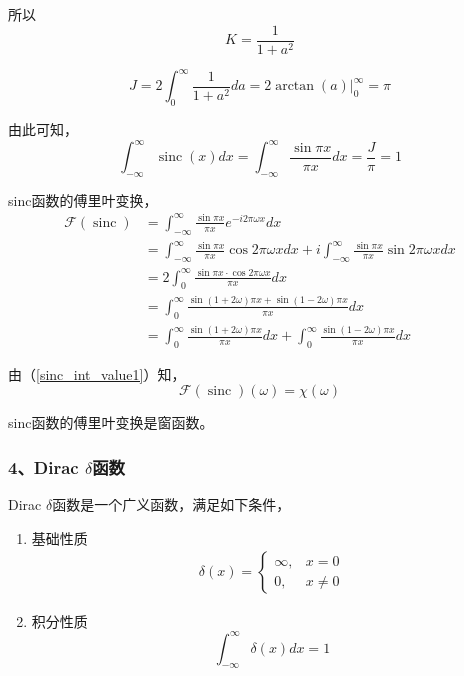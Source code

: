 		所以
		$$
			K = \frac{1}{1+ a^2}
		$$

		$$
			J = 2\int_{0}^{\infty} \frac{1}{1+a^2}da = 2\arctan(a)\Big|_0^\infty = \pi
		$$

		由此可知，
		\begin{equation}
			\int_{-\infty}^{\infty} \mathop{sinc}(x)dx = \int_{-\infty}^{\infty} \frac{\sin \pi x}{\pi x}dx = \frac{J}{\pi} = 1 \label{sinc_int_value1}
		\end{equation}

		sinc函数的傅里叶变换，
		\begin{align*}
			\mathcal{F}(\mathop{sinc}) 
				& = \int_{-\infty}^{\infty} \frac{\sin \pi x}{\pi x} e^{-i2\pi\omega x}dx\\
				&= \int_{-\infty}^{\infty} \frac{\sin \pi x}{\pi x} \cos 2\pi\omega x dx + i \int_{-\infty}^{\infty} \frac{\sin \pi x}{\pi x} \sin 2\pi\omega x dx\\
				&= 2 \int_0^\infty\frac{\sin \pi x  \cdot \cos 2\pi\omega x}{\pi x} dx\\
				&= \int_0^\infty\frac{\sin (1 + 2\omega)\pi x  + \sin (1 - 2\omega)\pi x}{\pi x} dx\\
				&= \int_0^\infty\frac{\sin (1 + 2\omega)\pi x }{\pi x} dx
				+ \int_0^\infty\frac{\sin (1 - 2\omega)\pi x}{\pi x} dx
		\end{align*}

		由（\ref{sinc_int_value1}）知，
		\begin{equation}
			\mathcal{F}(\mathop{sinc})(\omega) = \chi(\omega)\label{sinc_f_trans}
		\end{equation}

		sinc函数的傅里叶变换是窗函数。

	\subsubsection*{4、Dirac $\delta$函数}
	
		Dirac $\delta$函数是一个广义函数，满足如下条件，
		\begin{enumerate}
			\item 基础性质
				\begin{equation}\label{delta_func}
				\begin{aligned}
					\delta(x) = 
					\begin{cases}
						\infty, &x=0\\
						0, &x\neq 0
					\end{cases}
				\end{aligned}				
				\end{equation}

			\item 积分性质
				$$
					\int_{-\infty}^{\infty}\delta(x)dx = 1
				$$			
		\end{enumerate}

